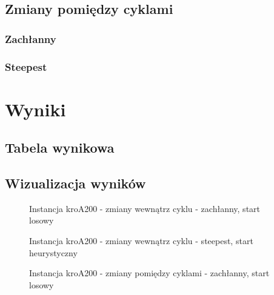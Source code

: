 \documentclass[11pt]{article}
\begin{document}
\subsection{Zmiany pomiędzy cyklami}\label{subsec:zmiany-pomiedzy-cyklami}

\subsubsection{Zachłanny}


\subsubsection{Steepest}


\section{Wyniki}\label{sec:wyniki}

\subsection{Tabela wynikowa}\label{subsec:tabela-wynikowa}

\subsection{Wizualizacja wyników}\label{subsec:wizualizacja-wynikow}
\begin{figure}[H]
    \centering
    \caption{Instancja kroA200 - zmiany wewnątrz cyklu - zachłanny, start losowy}
    \label{fig:Greedy-cycle-changes-kroA-random}
\end{figure}

\begin{figure}[H]
    \centering
    \caption{Instancja kroA200 - zmiany wewnątrz cyklu - steepest, start heurystyczny}
    \label{fig:Steepest-cycle-changes-kroA-heuristic}
\end{figure}

\begin{figure}[H]
    \centering
    \caption{Instancja kroA200 - zmiany pomiędzy cyklami - zachłanny, start losowy}
    \label{fig:Greedy-cycle-changes-kroA-intercycle-random}
\end{figure}
\end{document}
